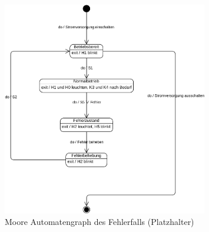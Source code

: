 \begin{figure}[H]
   \centering
   \includegraphics[width=0.8\textwidth]{Bilder/Fehlerfall.pdf}
   \caption[Automatengraph Fehlerfall]{Moore Automatengraph des Fehlerfalls (Platzhalter)}
   \label{fig:Bild5}
\end{figure}